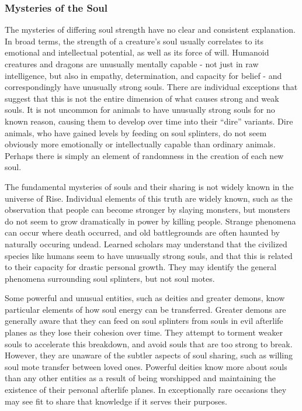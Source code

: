         \subsubsection{Mysteries of the Soul}
            The mysteries of differing soul strength have no clear and consistent explanation.
            In broad terms, the strength of a creature's soul usually correlates to its emotional and intellectual potential, as well as its force of will.
            Humanoid creatures and dragons are unusually mentally capable - not just in raw intelligence, but also in empathy, determination, and capacity for belief - and correspondingly have unusually strong souls.
            There are individual exceptions that suggest that this is not the entire dimension of what causes strong and weak souls.
            It is not uncommon for animals to have unusually strong souls for no known reason, causing them to develop over time into their ``dire'' variants.
            Dire animals, who have gained levels by feeding on soul splinters, do not seem obviously more emotionally or intellectually capable than ordinary animals.
            Perhaps there is simply an element of randomness in the creation of each new soul.

            The fundamental mysteries of souls and their sharing is not widely known in the universe of Rise.
            Individual elements of this truth are widely known, such as the observation that people can become stronger by slaying monsters, but monsters do not seem to grow dramatically in power by killing people.
            Strange phenomena can occur where death occurred, and old battlegrounds are often haunted by naturally occuring undead.
            Learned scholars may understand that the civilized species like humans seem to have unusually strong souls, and that this is related to their capacity for drastic personal growth.
            They may identify the general phenomena surrounding soul splinters, but not soul motes.

            Some powerful and unusual entities, such as deities and greater demons, know particular elements of how soul energy can be transferred.
            Greater demons are generally aware that they can feed on soul splinters from souls in evil afterlife planes as they lose their cohesion over time.
            They attempt to torment weaker souls to accelerate this breakdown, and avoid souls that are too strong to break.
            However, they are unaware of the subtler aspects of soul sharing, such as willing soul mote transfer between loved ones.
            Powerful deities know more about souls than any other entities as a result of being worshipped and maintaining the existence of their personal afterlife planes.
            In exceptionally rare occasions they may see fit to share that knowledge if it serves their purposes.

